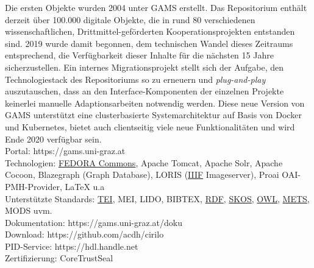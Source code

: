 \documentclass{article}
\begin{document}
        Die ersten Objekte wurden 2004 unter GAMS erstellt. Das Repositorium enthält
                  derzeit über 100.000 digitale Objekte, die in rund 80 verschiedenen
                  wissenschaftlichen, Drittmittel-geförderten Koope­rationsprojekten entstanden
                  sind. 2019 wurde damit begonnen, dem technischen Wandel dieses Zeitraums
                  entsprechend, die Verfügbarkeit dieser Inhalte für die nächsten 15 Jahre
                  sicherzustellen. Ein internes Migrationsprojekt stellt sich der Aufgabe, den
                  Technologiestack des Repositoriums so zu erneuern und \emph{plug-and-play} auszutauschen, dass an den Interface-Komponenten der
                  einzelnen Projekte keinerlei manuelle Adaptionsarbeiten notwendig wer­den. Diese
                  neue Version von GAMS unterstützt eine clusterbasierte Systemarchitektur auf Basis
                  von Docker und Kubernetes, bietet auch clientseitig viele neue Funktionalitäten
                  und wird Ende 2020 verfügbar sein.\\
            
        Portal: https://gams.uni-graz.at\\
            
        Technologien: \href{http://gams.uni-graz.at/o:konde.69}{FEDORA Commons},
                  Apache Tomcat, Apache Solr, Apache Cocoon, Blazegraph (Graph Database), LORIS
                     (\href{http://gams.uni-graz.at/o:konde.123}{IIIF} Imageserver), Proai
                  OAI-PMH-Provider, LaTeX u.a \\
            
        Unterstützte Standards: \href{http://gams.uni-graz.at/o:konde.178}{TEI}, MEI,
                  LIDO, BIBTEX, \href{http://gams.uni-graz.at/o:konde.131}{RDF}, \href{http://gams.uni-graz.at/o:konde.132}{SKOS}, \href{http://gams.uni-graz.at/o:konde.131}{OWL}, \href{http://gams.uni-graz.at/o:konde.129}{METS}, MODS uvm.\\
            
        Dokumentation: https://gams.uni-graz.at/doku\\
            
        Download: https://github.com/acdh/cirilo\\
            
        PID-Service: https://hdl.handle.net\\
            
        Zertifizierung: CoreTrustSeal\\
            
\end{document}
